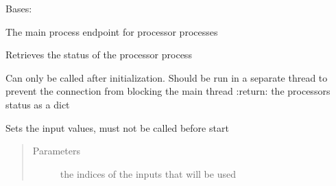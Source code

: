 \documentclass[letterpaper,10pt,english]{sphinxmanual}
\begin{document}
\begin{fulllineitems}
\label{\detokenize{src.processors:src.processors.models.Processor}}
Bases: 

The main process endpoint for processor processes

\begin{fulllineitems}
\label{\detokenize{src.processors:src.processors.models.Processor.retrieve_status}}
Retrieves the status of the processor process

Can only be called after initialization.
Should be run in a separate thread to prevent the connection from blocking the main thread
:return: the processors status as a dict

\end{fulllineitems}


\begin{fulllineitems}
\label{\detokenize{src.processors:src.processors.models.Processor.set_inputs}}
Sets the input values, must not be called before start
\begin{quote}\begin{description}
\item[{Parameters}] \leavevmode
{} \textendash{} the indices of the inputs that will be used

\end{description}\end{quote}


\end{fulllineitems}
\end{fulllineitems}
\end{document}
